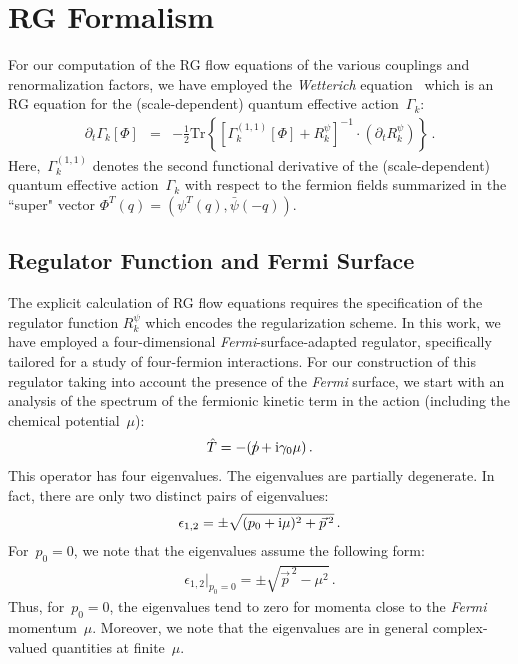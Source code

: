\documentclass[prd,english,preprintnumbers,amsmath,amssymb,nofootinbib,twocolumn,superscriptaddress]{revtex4-1}
\newcommand{\be}{\begin{eqnarray}}
\newcommand{\ee}{\end{eqnarray}}
\newcommand{\del}{\partial}
\newcommand{\fslash}{\hspace*{-0.2cm}\slash }
\begin{document}
{{%
\section{RG Formalism}\label{app:RG}
%

For our computation of the RG flow equations 
of the various couplings and renormalization factors, 
we have employed the {\it Wetterich} equation~\cite{Wetterich:1992yh} which is an RG equation for the
(scale-dependent) quantum effective {action~$\Gamma_k$:
%
\be
\!\!\!\!\!\!\del_t \Gamma_k[\Phi] &=& -\frac{1}{2} \text{Tr} \left \lbrace [ \Gamma^{(1,1)}_k [\Phi] + R_k^{\psi} ] ^{-1}\cdot (\del_t R_k^{\psi}) \right \rbrace\,.
\label{eq:WetterichEquation}
\ee
%
Here,~$\Gamma^{(1,1)}_k$} denotes the second functional derivative of the (scale-dependent) quantum effective action~$\Gamma_k$
with respect to the fermion fields summarized in the ``super" {vector $\Phi^T(q) = \left(\psi^T (q),\bar{\psi}(-q)\right)$.}

%
\subsection{Regulator Function and Fermi Surface}\label{app:regfs}
%

The explicit calculation of RG flow equations requires the specification of the regulator function $R_k^{\psi}$ which encodes 
the regularization scheme. 
{In this work, we} have employed a four-dimensional {\it Fermi}-surface-adapted {regulator, specifically tailored
for a study of four-fermion interactions.} 
For our construction of this regulator
taking into account the presence of the {\it Fermi} surface, we start with an 
analysis of the spectrum of the fermionic kinetic term in the action {(including the chemical potential~$\mu$):
%
\be
\hat{T} = -( p\fslash + {\rm i}\gamma_0\mu)\,.
\ee
%
This} operator has four eigenvalues. The eigenvalues are partially degenerate. In fact, {there are only two} 
distinct pairs of {eigenvalues:
%
\be
\epsilon_{1,2}=\pm \sqrt{ (p_0+{\rm i}\mu)^2 +\vec{p}^{\,2}}\,.
\ee
%
For~$p_0=0$, we} note that the eigenvalues assume the following form:
%
\be
\epsilon_{1,2}\big|_{p_0=0}=\pm \sqrt{\vec{p}^{\,2}- \mu^2}\,.\label{eq:zeroevfree}
\ee
%
Thus, for~$p_0=0$, the eigenvalues tend to zero for momenta close to the {\it Fermi} momentum~$\mu$. Moreover, we note that
the eigenvalues are in general complex-valued quantities at finite~$\mu$.

}}
\end{document}
